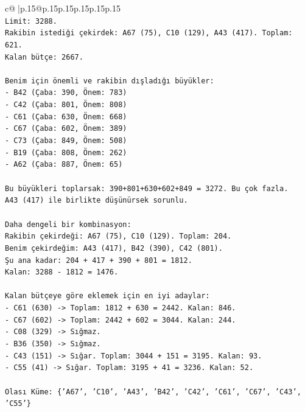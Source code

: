 \documentclass{article}
\begin{document}
{\begin{supertabular}{c@{$\;$}|p{.15\linewidth}@{}p{.15\linewidth}p{.15\linewidth}p{.15\linewidth}p{.15\linewidth}p{.15\linewidth}}
{{{\\ 
\texttt{Limit: 3288.} \\
\texttt{Rakibin istediği çekirdek: A67 (75), C10 (129), A43 (417). Toplam: 621.} \\
\texttt{Kalan bütçe: 2667.} \\
\\ 
\texttt{Benim için önemli ve rakibin dışladığı büyükler:} \\
\texttt{{-} B42 (Çaba: 390, Önem: 783)} \\
\texttt{{-} C42 (Çaba: 801, Önem: 808)} \\
\texttt{{-} C61 (Çaba: 630, Önem: 668)} \\
\texttt{{-} C67 (Çaba: 602, Önem: 389)} \\
\texttt{{-} C73 (Çaba: 849, Önem: 508)} \\
\texttt{{-} B19 (Çaba: 808, Önem: 262)} \\
\texttt{{-} A62 (Çaba: 887, Önem: 65)} \\
\\ 
\texttt{Bu büyükleri toplarsak: 390+801+630+602+849 = 3272. Bu çok fazla.} \\
\texttt{A43 (417) ile birlikte düşünürsek sorunlu.} \\
\\ 
\texttt{Daha dengeli bir kombinasyon:} \\
\texttt{Rakibin çekirdeği: A67 (75), C10 (129). Toplam: 204.} \\
\texttt{Benim çekirdeğim: A43 (417), B42 (390), C42 (801).} \\
\texttt{Şu ana kadar: 204 + 417 + 390 + 801 = 1812.} \\
\texttt{Kalan: 3288 {-} 1812 = 1476.} \\
\\ 
\texttt{Kalan bütçeye göre eklemek için en iyi adaylar:} \\
\texttt{{-} C61 (630) {-}> Toplam: 1812 + 630 = 2442. Kalan: 846.} \\
\texttt{{-} C67 (602) {-}> Toplam: 2442 + 602 = 3044. Kalan: 244.} \\
\texttt{{-} C08 (329) {-}> Sığmaz.} \\
\texttt{{-} B36 (350) {-}> Sığmaz.} \\
\texttt{{-} C43 (151) {-}> Sığar. Toplam: 3044 + 151 = 3195. Kalan: 93.} \\
\texttt{{-} C55 (41) {-}> Sığar. Toplam: 3195 + 41 = 3236. Kalan: 52.} \\
\\ 
\texttt{Olası Küme: \{'A67', 'C10', 'A43', 'B42', 'C42', 'C61', 'C67', 'C43', 'C55'\}} \\
}}}
\end{supertabular}}
\end{document}
